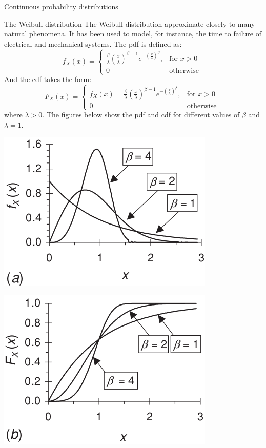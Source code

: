 \documentclass[8pt]{beamer}
\renewcommand{\emph}[1]{\textcolor{myorange}{#1}}
\begin{document}
\begin{frame}{Continuous probability distributions} 
    \begin{block}{The \alert{Weibull} distribution}
        The \alert{Weibull distribution} approximate closely to many natural phenomena. It has been used to model, for instance, the time to failure of electrical and mechanical systems. The \emph{pdf} is defined as:
\vspace{-5pt}
 \[
f_X (x) =
\begin{cases}
    \frac{\beta}{\lambda} \left( \frac{x}{\lambda} \right)^{\beta -1} e^{-\left( \frac{x}{\lambda} \right)^{\beta}}, & \text{for } x > 0  \\
    0 & \text{otherwise }
\end{cases}
\]
And the \emph{cdf} takes the form:
\vspace{-5pt}
 \[
F_X (x) =
\begin{cases}
    f_X (x) = \frac{\beta}{\lambda} \left( \frac{x}{\lambda} \right)^{\beta -1} e^{-\left( \frac{x}{\lambda} \right)^{\beta}}, & \text{for } x > 0  \\
    0 & \text{otherwise }
\end{cases}
\]
where $\lambda > 0$. The figures below show the \emph{pdf} and \emph{cdf} for different values of $\beta$ and $\lambda = 1$.
\end{block}
\vspace{-5pt}
\begin{minipage}{0.49\textwidth}
\centering
\includegraphics[width=0.8\linewidth]{fi426a.png}  %
\end{minipage}
\hfill
\begin{minipage}{0.49\textwidth}
\centering
\includegraphics[width=0.8\linewidth]{fi426b.png} %

\end{minipage}
\end{frame}
\end{document}
